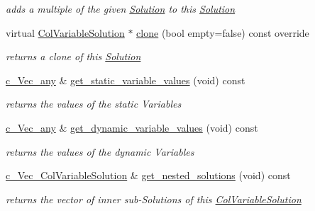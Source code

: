 \begin{Indent}
\begin{DoxyCompactItemize}
\begin{DoxyCompactList}\small\item\em adds a multiple of the given \mbox{\hyperlink{class_s_m_spp__di__unipi__it_1_1_solution}{Solution}} to this \mbox{\hyperlink{class_s_m_spp__di__unipi__it_1_1_solution}{Solution}} \end{DoxyCompactList}\item 
virtual \mbox{\hyperlink{class_s_m_spp__di__unipi__it_1_1_col_variable_solution}{Col\+Variable\+Solution}} $\ast$ \mbox{\hyperlink{class_s_m_spp__di__unipi__it_1_1_col_variable_solution_a3088fd7540cc9da5a5539a4c9deea8ea}{clone}} (bool empty=false) const override
\begin{DoxyCompactList}\small\item\em returns a clone of this \mbox{\hyperlink{class_s_m_spp__di__unipi__it_1_1_solution}{Solution}} \end{DoxyCompactList}\item 
\mbox{\hyperlink{group___s_m_s__types_gaa16aeddc7a50d64299ee0f8d9ca5dc7d}{c\+\_\+\+Vec\+\_\+any}} \& \mbox{\hyperlink{class_s_m_spp__di__unipi__it_1_1_col_variable_solution_a99d0f17d8b6069fbaf8c5650ed14e573}{get\+\_\+static\+\_\+variable\+\_\+values}} (void) const
\begin{DoxyCompactList}\small\item\em returns the values of the {\itshape static} Variables \end{DoxyCompactList}\item 
\mbox{\hyperlink{group___s_m_s__types_gaa16aeddc7a50d64299ee0f8d9ca5dc7d}{c\+\_\+\+Vec\+\_\+any}} \& \mbox{\hyperlink{class_s_m_spp__di__unipi__it_1_1_col_variable_solution_a6373359b6454ca1880b8494dd1cd0164}{get\+\_\+dynamic\+\_\+variable\+\_\+values}} (void) const
\begin{DoxyCompactList}\small\item\em returns the values of the {\itshape dynamic} Variables \end{DoxyCompactList}\item 
\mbox{\hyperlink{group___col_variable_solution___t_y_p_e_s_gac9f0485d8cd9fac29d0b83dbc3242c0e}{c\+\_\+\+Vec\+\_\+\+Col\+Variable\+Solution}} \& \mbox{\hyperlink{class_s_m_spp__di__unipi__it_1_1_col_variable_solution_ab3ad6d01d365ff2ad0997dc774a1fe64}{get\+\_\+nested\+\_\+solutions}} (void) const
\begin{DoxyCompactList}\small\item\em returns the vector of inner sub-\/\+Solutions of this \mbox{\hyperlink{class_s_m_spp__di__unipi__it_1_1_col_variable_solution}{Col\+Variable\+Solution}} \end{DoxyCompactList}\end{DoxyCompactItemize}
\end{Indent}
